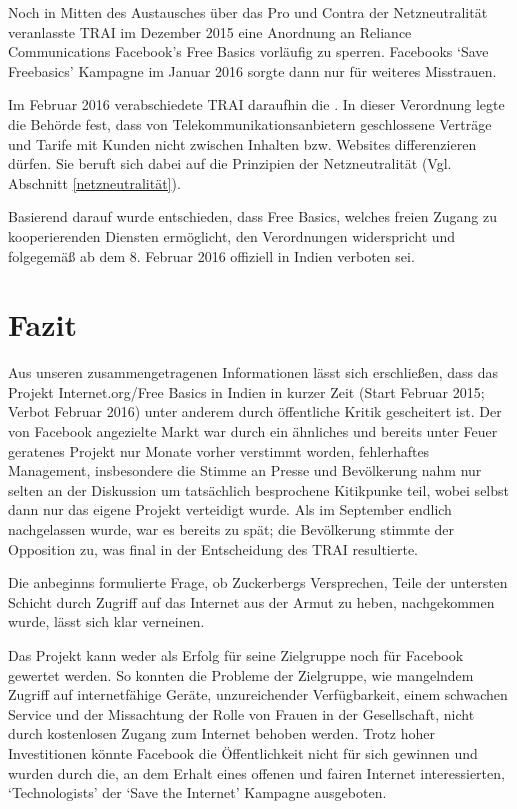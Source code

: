 \documentclass{article}
\begin{document}
Noch in Mitten des Austausches über das Pro und Contra der Netzneutralität veranlasste TRAI im Dezember 2015 eine Anordnung an Reliance Communications Facebook's Free Basics vorläufig zu sperren\autocite{governanceAsIdeology}.
Facebooks `Save Freebasics' Kampagne im Januar 2016 sorgte dann nur für weiteres Misstrauen.

Im Februar 2016 verabschiedete TRAI daraufhin die \textcite{regulationBan}.
In dieser Verordnung legte die Behörde fest, dass von Telekommunikationsanbietern geschlossene Verträge und Tarife mit Kunden nicht zwischen Inhalten bzw. Websites differenzieren dürfen.
Sie beruft sich dabei auf die Prinzipien der Netzneutralität (Vgl. Abschnitt \ref{netzneutralität}).

Basierend darauf wurde entschieden, dass Free Basics, welches freien Zugang zu kooperierenden Diensten ermöglicht, den
Verordnungen widerspricht und folgegemäß ab dem 8. Februar 2016 offiziell in Indien verboten sei.

\break
\section{Fazit}

Aus unseren zusammengetragenen Informationen lässt sich erschließen, dass das Projekt Internet.org/Free Basics in Indien in kurzer Zeit (Start Februar 2015; Verbot Februar 2016) unter anderem durch öffentliche Kritik gescheitert ist.
Der von Facebook angezielte Markt war durch ein ähnliches und bereits unter Feuer geratenes Projekt nur Monate vorher verstimmt worden, fehlerhaftes Management, insbesondere die Stimme an Presse und Bevölkerung nahm nur selten an der Diskussion um tatsächlich besprochene Kitikpunke teil, wobei selbst dann nur das eigene Projekt verteidigt wurde.
Als im September endlich nachgelassen wurde, war es bereits zu spät; die Bevölkerung stimmte der Opposition zu, was final in der Entscheidung des TRAI resultierte.

Die anbeginns formulierte Frage, ob Zuckerbergs Versprechen, Teile der untersten Schicht durch Zugriff auf das Internet aus der Armut zu heben, nachgekommen wurde, lässt sich klar verneinen.

Das Projekt kann weder als Erfolg für seine Zielgruppe noch für Facebook gewertet werden. So konnten die Probleme der Zielgruppe, wie mangelndem Zugriff auf internetfähige Geräte, unzureichender Verfügbarkeit, einem schwachen Service und der Missachtung der Rolle von Frauen in der Gesellschaft, nicht durch kostenlosen Zugang zum Internet behoben werden. Trotz hoher Investitionen könnte Facebook die Öffentlichkeit nicht für sich gewinnen und wurden durch die, an dem Erhalt eines offenen und fairen Internet interessierten, `Technologists' der `Save the Internet' Kampagne ausgeboten.
\end{document}
